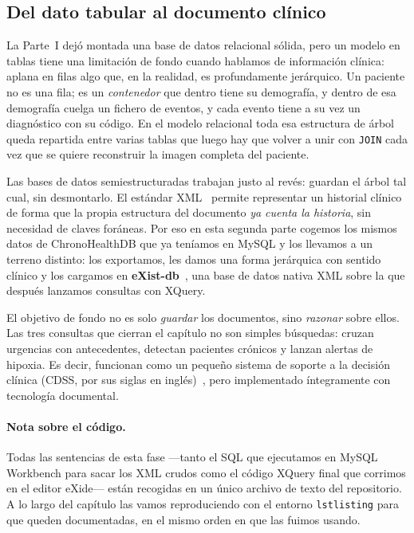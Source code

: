 \documentclass[../main.tex]{subfiles}
\begin{document}
\subsection{Del dato tabular al documento clínico}

La Parte~I dejó montada una base de datos relacional sólida, pero un modelo en tablas tiene una limitación de fondo cuando hablamos de información clínica: aplana en filas algo que, en la realidad, es profundamente jerárquico. Un paciente no es una fila; es un \textit{contenedor} que dentro tiene su demografía, y dentro de esa demografía cuelga un fichero de eventos, y cada evento tiene a su vez un diagnóstico con su código. En el modelo relacional toda esa estructura de árbol queda repartida entre varias tablas que luego hay que volver a unir con \texttt{JOIN} cada vez que se quiere reconstruir la imagen completa del paciente.

Las bases de datos semiestructuradas trabajan justo al revés: guardan el árbol tal cual, sin desmontarlo. El estándar XML~\cite{w3cxml} permite representar un historial clínico de forma que la propia estructura del documento \textit{ya cuenta la historia}, sin necesidad de claves foráneas. Por eso en esta segunda parte cogemos los mismos datos de ChronoHealthDB que ya teníamos en MySQL y los llevamos a un terreno distinto: los exportamos, les damos una forma jerárquica con sentido clínico y los cargamos en \textbf{eXist-db}~\cite{existdb}, una base de datos nativa XML sobre la que después lanzamos consultas con XQuery.

El objetivo de fondo no es solo \textit{guardar} los documentos, sino \textit{razonar} sobre ellos. Las tres consultas que cierran el capítulo no son simples búsquedas: cruzan urgencias con antecedentes, detectan pacientes crónicos y lanzan alertas de hipoxia. Es decir, funcionan como un pequeño sistema de soporte a la decisión clínica (CDSS, por sus siglas en inglés)~\cite{sutton2020}, pero implementado íntegramente con tecnología documental.

\paragraph{Nota sobre el código.} Todas las sentencias de esta fase ---tanto el SQL que ejecutamos en MySQL Workbench para sacar los XML crudos como el código XQuery final que corrimos en el editor eXide--- están recogidas en un único archivo de texto del repositorio. A lo largo del capítulo las vamos reproduciendo con el entorno \texttt{lstlisting} para que queden documentadas, en el mismo orden en que las fuimos usando.
\end{document}
